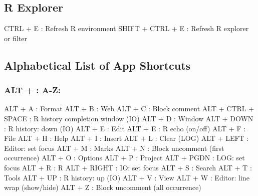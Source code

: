 \hypertarget{basic_card_rexplorer}{}
\subsection{R Explorer}

\vspace{-0.5cm}
\begin{Rtables}[caption={[R explorer keyboard shortcuts]
    R explorer keyboard shortcuts},
  label=shortcut:rexplorer]
  CTRL  + E               : Refresh R environment
  SHIFT + CTRL + E        : Refresh R explorer or filter
\end{Rtables}


\newpage
\hypertarget{basic_card_alphabetical}{}
\subsection{Alphabetical List of App Shortcuts}


\subsubsection{ALT + : A-Z:}

\vspace{-0.5cm}
\begin{Rtables}[caption={[ALT keyboard shortcuts]
    ALT Keyboard Shortcuts},
  label=shortcut:alt]
  ALT + A                 : Format
  ALT + B                 : Web
  ALT + C                 : Block comment
  ALT + CTRL + SPACE      : R history completion window (IO)
  ALT + D                 : Window
  ALT + DOWN              : R history: down (IO)
  ALT + E                 : Edit
  ALT + E                 : R echo (on/off)
  ALT + F                 : File
  ALT + H                 : Help
  ALT + I                 : Insert
  ALT + L                 : Clear (LOG)
  ALT + LEFT              : Editor: set focus
  ALT + M                 : Marks
  ALT + N                 : Block uncomment (first occurrence)
  ALT + O                 : Options
  ALT + P                 : Project
  ALT + PGDN              : LOG: set focus
  ALT + R                 : R
  ALT + RIGHT             : IO: set focus
  ALT + S                 : Search
  ALT + T                 : Tools
  ALT + UP                : R history: up (IO)
  ALT + V                 : View
  ALT + W                 : Editor: line wrap (show/hide)
  ALT + Z                 : Block uncomment (all occurrence)
\end{Rtables}


